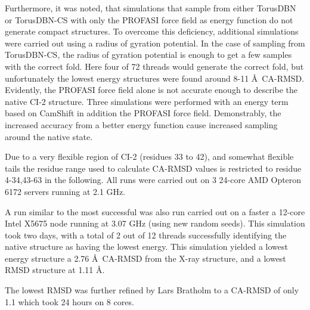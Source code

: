 Furthermore, it was noted, that simulations that sample from either TorusDBN or TorusDBN-CS with only the PROFASI force field as energy function do not generate compact structures.
To overcome this deficiency, additional simulations were carried out using a radius of gyration potential.
In the case of sampling from TorusDBN-CS, the radius of gyration potential is enough to get a few samples with the correct fold. Here four of 72 threads would generate the correct fold, but unfortunately the lowest energy structures were found around 8-11 \AA\ CA-RMSD. Evidently, the PROFASI force field alone is not accurate enough to describe the native CI-2 structure.
Three simulations were performed with an energy term based on CamShift in addition the PROFASI force field.
Demonstrably, the increased accuracy from a better energy function cause increased sampling around the native state.

Due to a very flexible region of CI-2 (residues 33 to 42), and somewhat flexible tails the residue range used to calculate CA-RMSD values is restricted to residue 4-34,43-63 in the following.
All runs were carried out on 3 24-core AMD Opteron 6172 servers running at 2.1 GHz. 

A run similar to the most successful was also run carried out on a faster a 12-core Intel X5675 node running at 3.07 GHz (using new random seeds).
This simulation took two days, with a total of 2 out of 12 threads successfully identifying the native structure as having the lowest energy.
This simulation yielded a lowest energy structure a 2.76 \AA~CA-RMSD from the X-ray structure, and a lowest RMSD structure at 1.11 \AA.

The lowest RMSD was further refined by Lars Bratholm to a CA-RMSD of only 1.1 which took 24 hours on 8 cores.


